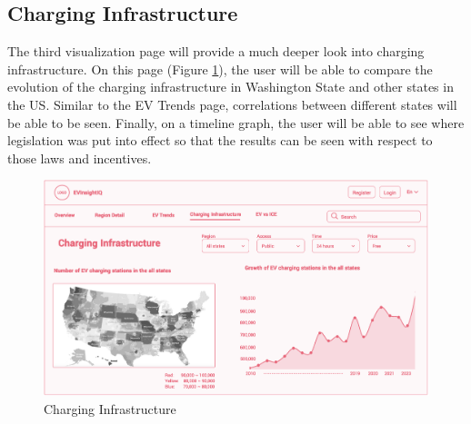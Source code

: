\documentclass{article}
\begin{document}
\subsection{Charging Infrastructure}
The third visualization page will provide a much deeper look into charging
infrastructure.  On this page (Figure \ref{fig:charge}), the user will be able
to compare the evolution of the charging infrastructure in Washington State and
other states in the US.  Similar to the EV Trends page, correlations between
different states will be able to be seen.  Finally, on a timeline graph, the
user will be able to see where legislation was put into effect so that the
results can be seen with respect to those laws and incentives.
\begin{figure}[ht]
    \centering
    \includegraphics[scale=0.25]{Charging Infrastructure}
    \caption{Charging Infrastructure}
    \label{fig:charge}
\end{figure}

\newpage
\end{document}

